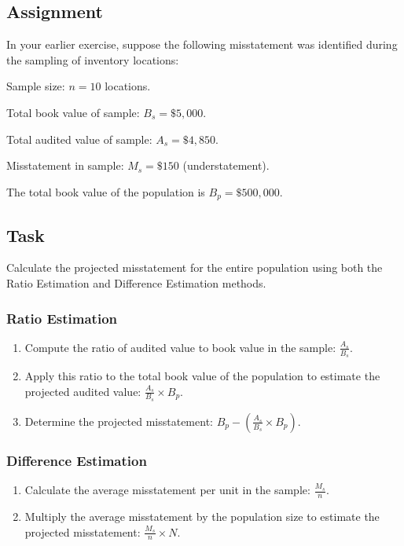 \documentclass[12pt,a4paper]{memoir}
\begin{document}
\subsection*{Assignment}
In your earlier exercise, suppose the following misstatement was identified during the sampling of inventory locations:

\begin{compactitem}
    \item Sample size: $n = 10$ locations.
    \item Total book value of sample: $B_s = \$5,000$.
    \item Total audited value of sample: $A_s = \$4,850$.
    \item Misstatement in sample: $M_s = \$150$ (understatement).
\end{compactitem}

The total book value of the population is $B_p = \$500,000$.

\subsection*{Task}
Calculate the projected misstatement for the entire population using both the Ratio Estimation and Difference Estimation methods.

\subsubsection*{Ratio Estimation}
\begin{enumerate}
    \item Compute the ratio of audited value to book value in the sample: $\frac{A_s}{B_s}$.
    \item Apply this ratio to the total book value of the population to estimate the projected audited value: $\frac{A_s}{B_s} \times B_p$.
    \item Determine the projected misstatement: $B_p - \left( \frac{A_s}{B_s} \times B_p \right)$.
\end{enumerate}

\subsubsection*{Difference Estimation}
\begin{enumerate}
    \item Calculate the average misstatement per unit in the sample: $\frac{M_s}{n}$.
    \item Multiply the average misstatement by the population size to estimate the projected misstatement: $\frac{M_s}{n} \times N$.
\end{enumerate}
\end{document}
